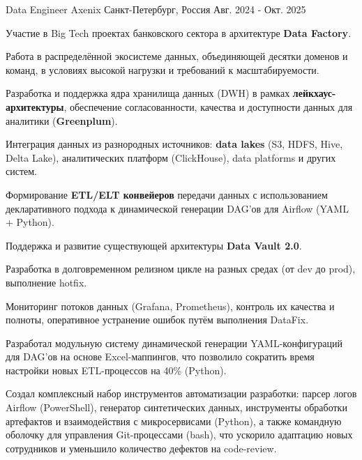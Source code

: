 

\begin{cventries}

  \cventry
    {Data Engineer} %
    {Axenix} %
    {Санкт-Петербург, Россия} %
    {Авг. 2024 - Окт. 2025} %
    {
      \begin{cvitems}
        \item {Участие в Big Tech проектах банковского сектора в архитектуре \textbf{Data Factory}.}
        \item {Работа в распределённой экосистеме данных, объединяющей десятки доменов и команд, в условиях высокой нагрузки и требований к масштабируемости.}
        \item {Разработка и поддержка ядра хранилища данных (DWH) в рамках \textbf{лейкхаус-архитектуры}, обеспечение согласованности, качества и доступности данных для аналитики (\textbf{Greenplum}).}
        \item {Интеграция данных из разнородных источников: \textbf{data lakes} (S3, HDFS, Hive, Delta Lake), аналитических платформ (ClickHouse), data platforms и других систем.}
        \item {Формирование \textbf{ETL/ELT конвейеров} передачи данных с использованием декларативного подхода к динамической генерации DAG’ов для Airflow (YAML + Python).}
        \item {Поддержка и развитие существующей архитектуры \textbf{Data Vault 2.0}.}
        \item {Разработка в долговременном релизном цикле на разных средах (от dev до prod), выполнение hotfix.}
        \item {Мониторинг потоков данных (Grafana, Prometheus), контроль их качества и полноты, оперативное устранение ошибок путём выполнения DataFix.}
        \item {Разработал модульную систему динамической генерации YAML-конфигураций для DAG’ов на основе Excel-маппингов, что позволило сократить время настройки новых ETL-процессов на 40\% (Python).}
        \item {Создал комплексный набор инструментов автоматизации разработки: парсер логов Airflow (PowerShell), генератор синтетических данных, инструменты обработки артефактов и взаимодействия с микросервисами (Python), а также командную оболочку для управления Git-процессами (bash), что ускорило адаптацию новых сотрудников и уменьшило количество дефектов на code-review.}

\end{cvitems}}
\end{cventries}
